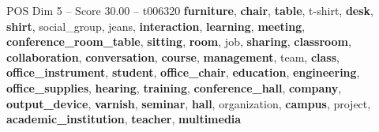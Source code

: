 \begin{textsample}{POS Dim 5 – Score 30.00 – t006320}  \label{ex:f5_pos_019}
\textbf{furniture}, \textbf{chair}, \textbf{table}, t-shirt, \textbf{desk}, \textbf{shirt}, social\_group, jeans, \textbf{interaction}, \textbf{learning}, \textbf{meeting}, \textbf{conference\_room\_table}, \textbf{sitting}, \textbf{room}, job, \textbf{sharing}, \textbf{classroom}, \textbf{collaboration}, \textbf{conversation}, \textbf{course}, \textbf{management}, team, \textbf{class}, \textbf{office\_instrument}, \textbf{student}, \textbf{office\_chair}, \textbf{education}, \textbf{engineering}, \textbf{office\_supplies}, \textbf{hearing}, \textbf{training}, \textbf{conference\_hall}, \textbf{company}, \textbf{output\_device}, \textbf{varnish}, \textbf{seminar}, \textbf{hall}, organization, \textbf{campus}, project, \textbf{academic\_institution}, \textbf{teacher}, \textbf{multimedia}

\end{textsample}
